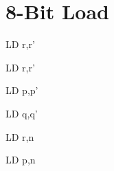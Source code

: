 \documentclass[12pt,twoside,openright,a4paper]{book}
\begin{document}
\section{8-Bit Load}

\begin{instrtable}	

	\begin{instruction}{LD r,r'}
			\Flags{\FN}{\FN}{\FN}{\FN}{\FN}{\FN}
	\end{instruction}

	\begin{instruction}{LD r,r'}
			\Flags{\FN}{\FN}{\FN}{\FN}{\FN}{\FN}
	\end{instruction}
		
	\begin{instruction}{LD p,p'}
			\Flags{\FN}{\FN}{\FN}{\FN}{\FN}{\FN}
		\SkipToOpCode
	\end{instruction}

	\begin{instruction}{LD q,q'}
			\Flags{\FN}{\FN}{\FN}{\FN}{\FN}{\FN}
	\SkipToOpCode
	\end{instruction}

	\begin{instruction}{LD r,n}
			\Flags{\FN}{\FN}{\FN}{\FN}{\FN}{\FN}
		\SkipToOpCode
	\end{instruction}

	\begin{instruction}{LD p,n}
			\Flags{\FN}{\FN}{\FN}{\FN}{\FN}{\FN}
		\SkipToOpCode
		\SkipToOpCode
	\end{instruction}
	

\end{instrtable}
\end{document}
